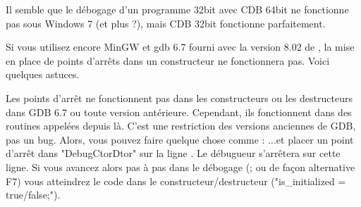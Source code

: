 Il semble que le débogage d'un programme 32bit avec CDB 64bit ne fonctionne pas sous Windows 7 (et plus ?), mais CDB 32bit fonctionne parfaitement.



Si vous utilisez encore MinGW et gdb 6.7 fourni avec la version 8.02 de \codeblocks, la mise en place de points d'arrêts dans un constructeur ne fonctionnera pas. Voici quelques astuces.

Les points d'arrêt ne fonctionnent pas dans les constructeurs ou les destructeurs dans GDB 6.7 ou toute version antérieure. Cependant, ils fonctionnent dans des routines appelées depuis là. C'est une restriction des versions anciennes de GDB, pas un bug. Alors, vous pouvez faire quelque chose comme : 
...et placer un point d'arrêt dans "DebugCtorDtor" sur la ligne . Le débugueur s'arrêtera sur cette ligne. Si vous avancez alors pas à pas dans le débogage (; ou de façon alternative F7) vous atteindrez le code dans le constructeur/destructeur ("is\_initialized = true/false;"). 
